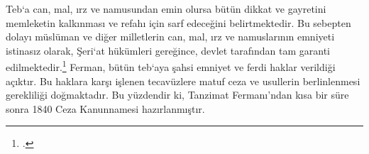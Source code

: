 Teb`a can, mal, ırz ve namusundan emin olursa bütün dikkat ve gayretini memleketin kalkınması ve refahı için sarf edeceğini belirtmektedir. Bu sebepten dolayı müslüman ve diğer milletlerin can, mal, ırz ve namuslarının emniyeti
istinasız olarak, Şeri`at hükümleri gereğince, devlet tarafından tam garanti edilmektedir.\footcite[101]{tanzimat} Ferman, bütün teb`aya şahsi emniyet ve ferdi haklar verildiği açıktır. Bu haklara karşı işlenen tecavüzlere matuf ceza 
ve usullerin berlinlenmesi gerekliliği doğmaktadır. Bu yüzdendir ki, Tanzimat Fermanı'ndan kısa bir süre sonra 1840 Ceza Kanunnamesi hazırlanmıştır.

